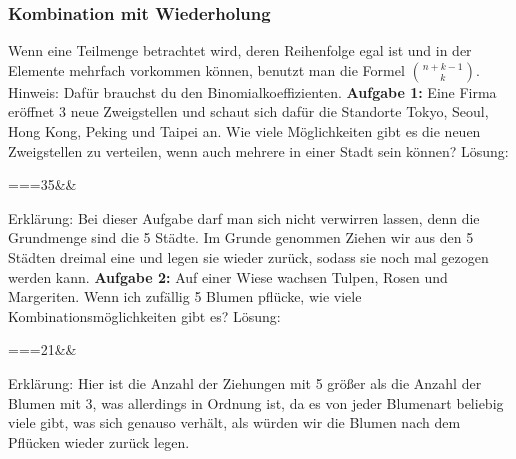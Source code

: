 \documentclass[12pt]{article}
\begin{document}
			\subsubsection{Kombination mit Wiederholung}
				Wenn eine Teilmenge betrachtet wird, deren Reihenfolge egal ist und in der Elemente mehrfach vorkommen können, benutzt man die Formel $\genfrac{(}{)}{0pt}{}{n+k-1}{k}$. Hinweis: Dafür brauchst du den Binomialkoeffizienten.\newline\newline
				\textbf{Aufgabe 1:} Eine Firma eröffnet 3 neue Zweigstellen und schaut sich dafür die Standorte Tokyo, Seoul, Hong Kong, Peking und Taipei an. Wie viele Möglichkeiten gibt es die neuen Zweigstellen zu verteilen, wenn auch mehrere in einer Stadt sein können?\newline\newline
				Lösung:
				\begin{flalign*}
					===35&&
				\end{flalign*}
				Erklärung: Bei dieser Aufgabe darf man sich nicht verwirren lassen, denn die Grundmenge sind die 5 Städte. Im Grunde genommen Ziehen wir aus den 5 Städten dreimal eine und legen sie wieder zurück, sodass sie noch mal gezogen werden kann.\newline\newline
				\textbf{Aufgabe 2:} Auf einer Wiese wachsen Tulpen, Rosen und Margeriten. Wenn ich zufällig 5 Blumen pflücke, wie viele Kombinationsmöglichkeiten gibt es?\newline\newline
				Lösung:
				\begin{flalign*}
					==\frac{7!}{(7-5)!\cdot 5!}=21&&
				\end{flalign*}
				Erklärung: Hier ist die Anzahl der Ziehungen mit 5 größer als die Anzahl der Blumen mit 3, was allerdings in Ordnung ist, da es von jeder Blumenart beliebig viele gibt, was sich genauso verhält, als würden wir die Blumen nach dem Pflücken wieder zurück legen.
\end{document}
